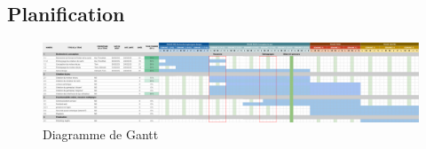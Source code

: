 

\subsection{Planification}


\begin{figure}[!h]
    \centering
    \includegraphics[width=0.99\linewidth]{images/gantt.png}
    \caption{Diagramme de Gantt}
    \label{fig:enter-label}
\end{figure}